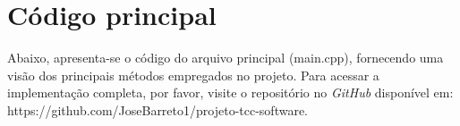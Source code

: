 
\chapter{Código principal}\label{cap:apendicea}

Abaixo, apresenta-se o código do arquivo principal (main.cpp), fornecendo 
uma visão dos principais métodos empregados no projeto. Para acessar 
a implementação completa, por favor, visite o repositório no \textit{GitHub} 
disponível em: https://github.com/JoseBarreto1/projeto-tcc-software.

